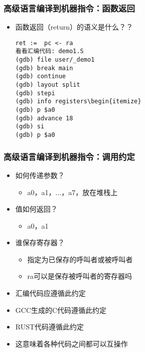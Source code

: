 \begin{frame}[fragile]
	\frametitle{高级语言编译到机器指令：\small{函数返回}}
	
	\begin{itemize}
		
		\item 函数返回（return）的语义是什么？？	
		
		
\begin{block}{}
\begin{verbatim}
ret :=  pc <- ra
看看汇编代码: demo1.S
(gdb) file user/_demo1
(gdb) break main
(gdb) continue
(gdb) layout split
(gdb) stepi
(gdb) info registers\begin{itemize}
(gdb) p $a0
(gdb) advance 18
(gdb) si
(gdb) p $a0
\end{verbatim}
\end{block}  

	\end{itemize}
	
\end{frame}



\begin{frame}
	\frametitle{高级语言编译到机器指令：\small{调用约定}}
	
 \begin{itemize}
	\item 如何传递参数？
	\begin{itemize}
	 	\item a0，a1，...，a7，放在堆栈上
	\end{itemize}
	\item 值如何返回？
	\begin{itemize}
		\item a0，a1
	\end{itemize}	
	\item 谁保存寄存器？
	\begin{itemize}
		\item 指定为已保存的呼叫者或被呼叫者
	    \item ra可以是保存被呼叫者的寄存器吗
    \end{itemize}   
	
	\item 汇编代码应遵循此约定
	\item GCC生成的C代码遵循此约定
	\item RUST代码遵循此约定
	\item 这意味着各种代码之间都可以互操作

\end{itemize} 
	
\end{frame}

